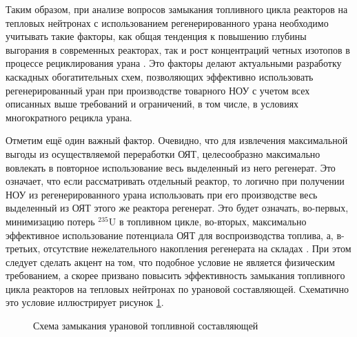 Таким образом, при анализе вопросов замыкания топливного цикла реакторов на тепловых нейтронах с использованием регенерированного урана необходимо учитывать такие факторы, как общая тенденция к повышению глубины выгорания в современных реакторах, так и рост концентраций четных изотопов в процессе рециклирования урана \cite{andrianovaPovyshenieVygoraniyaTopliva2008}. Это факторы делают актуальными разработку каскадных обогатительных схем, позволяющих эффективно использовать регенерированный уран при производстве товарного НОУ с учетом всех описанных выше требований и ограничений, в том числе, в условиях многократного рецикла урана.

Отметим ещё один важный фактор. Очевидно, что для извлечения максимальной выгоды из осуществляемой переработки ОЯТ, целесообразно максимально вовлекать в повторное использование весь выделенный из него регенерат. Это означает, что если рассматривать отдельный реактор, то логично при получении НОУ из регенерированного урана использовать при его производстве весь выделенный из ОЯТ этого же реактора регенерат. Это будет означать, во-первых, минимизацию потерь $^{235}$U в топливном цикле, во-вторых, максимально эффективное использование потенциала ОЯТ для воспроизводства топлива, а, в-третьих, отсутствие нежелательного накопления регенерата на складах \cite{tendallNuclearEnergyEurope2011}. При этом следует сделать акцент на том, что подобное условие не является физическим требованием, а скорее призвано повысить эффективность замыкания топливного цикла реакторов на тепловых нейтронах по урановой составляющей. Схематично это условие иллюстрирует рисунок \ref{reconeto}.  

\begin{figure}[ht]
  \caption{Схема замыкания урановой топливной составляющей}\label{reconeto}
\end{figure}


